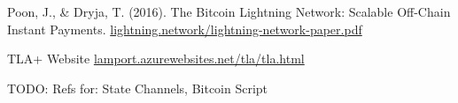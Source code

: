 \documentclass[a4paper]{article}
\begin{document}
\begin{multicols}{2}
\begin{thebibliography}{8}
 Poon, J., \& Dryja, T. (2016). The Bitcoin Lightning Network:
Scalable Off-Chain Instant Payments. \href{https://lightning.network/lightning-network-paper.pdf}{lightning.network/lightning-network-paper.pdf}

 TLA+ Website \href{https://lamport.azurewebsites.net/tla/tla.html}{lamport.azurewebsites.net/tla/tla.html}

TODO: Refs for: State Channels, Bitcoin Script


\end{thebibliography}

\end{multicols}
\end{document}
